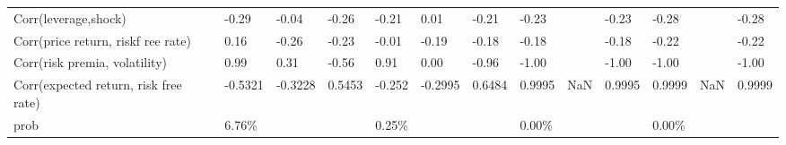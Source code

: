 \documentclass{report}
\begin{document}
\begin{tabular}{lllllllllllll}
Corr(leverage,shock)                  &   -0.29 &   -0.04 &   -0.26 &  -0.21 &    0.01 &   -0.21 &   -0.23 &        &   -0.23 &   -0.28 &        &   -0.28 \\
Corr(price return, riskf ree rate)    &    0.16 &   -0.26 &   -0.23 &  -0.01 &   -0.19 &   -0.18 &   -0.18 &        &   -0.18 &   -0.22 &        &   -0.22 \\
Corr(risk premia, volatility)         &    0.99 &    0.31 &   -0.56 &   0.91 &    0.00 &   -0.96 &   -1.00 &        &   -1.00 &   -1.00 &        &   -1.00 \\
Corr(expected return, risk free rate) & -0.5321 & -0.3228 &  0.5453 & -0.252 & -0.2995 &  0.6484 &  0.9995 &    NaN &  0.9995 &  0.9999 &    NaN &  0.9999 \\
prob                                  &   6.76\% &         &         &  0.25\% &         &         &   0.00\% &        &         &   0.00\% &        &         \\
\bottomrule
\end{tabular}
\end{document}
